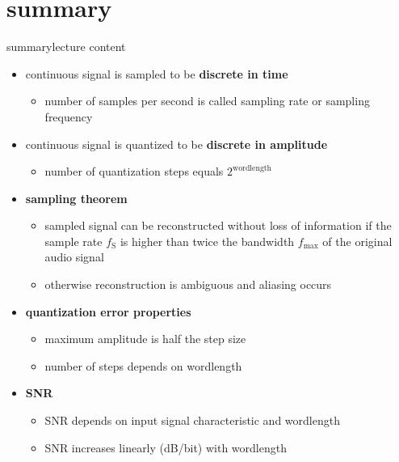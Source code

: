     \section{summary}
        \begin{frame}{summary}{lecture content}
            \begin{itemize}
                \item   continuous signal is sampled to be \textbf{discrete in time}
                    \begin{itemize}
                        \item   number of samples per second is called sampling rate or sampling frequency
                    \end{itemize}
                \item   continuous signal is quantized to be \textbf{discrete in amplitude}
                    \begin{itemize}
                        \item   number of quantization steps equals $2^\mathrm{wordlength}$
                    \end{itemize}
                \bigskip
                \item      \textbf{sampling theorem}
                    \begin{itemize}
                        \item   sampled signal can be reconstructed without loss of information if the sample rate $f_\mathrm{S}$ is higher than twice the bandwidth $f_\mathrm{max}$ of the original audio signal
                        \item   otherwise reconstruction is ambiguous and  aliasing occurs
                    \end{itemize}
                \bigskip
               \item      \textbf{quantization error properties}
                    \begin{itemize}
                        \item   maximum amplitude is half the step size
                        \item   number of steps depends on wordlength
                    \end{itemize}
                \bigskip
                \item      \textbf{SNR}
                    \begin{itemize}
                        \item   SNR depends on input signal characteristic and wordlength
                        \item   SNR increases linearly (\unit[6]{dB}/bit) with wordlength
                    \end{itemize}
            \end{itemize}
        \end{frame}


